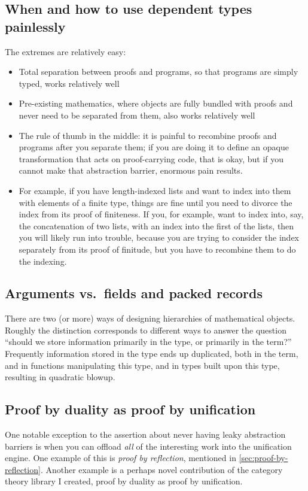 \documentclass[twoside]{article}
\begin{document}
\subsection{When and how to use dependent types painlessly}
The extremes are relatively easy:
\begin{itemize}
\item Total separation between proofs and programs, so that programs are simply typed, works relatively well
\item Pre-existing mathematics, where objects are fully bundled with proofs and never need to be separated from them, also works relatively well
\item The rule of thumb in the middle: it is painful to recombine proofs and programs after you separate them; if you are doing it to define an opaque transformation that acts on proof-carrying code, that is okay, but if you cannot make that abstraction barrier, enormous pain results.
\item For example, if you have length-indexed lists and want to index into them with elements of a finite type, things are fine until you need to divorce the index from its proof of finiteness.  If you, for example, want to index into, say, the concatenation of two lists, with an index into the first of the lists, then you will likely run into trouble, because you are trying to consider the index separately from its proof of finitude, but you have to recombine them to do the indexing.
\end{itemize}

\subsection{Arguments vs.~fields and packed records}
There are two (or more) ways of designing hierarchies of mathematical objects.
Roughly the distinction corresponds to different ways to answer the question ``should we store information primarily in the type, or primarily in the term?''
Frequently information stored in the type ends up duplicated, both in the term, and in functions manipulating this type, and in types built upon this type, resulting in quadratic blowup.

\subsection{Proof by duality as proof by unification}
One notable exception to the assertion about never having leaky abstraction barriers is when you can offload \emph{all} of the interesting work into the unification engine.
One example of this is \emph{proof by reflection}, mentioned in \autoref{sec:proof-by-reflection}.
Another example is a perhaps novel contribution of the category theory library I created, proof by duality as proof by unification.
\end{document}
